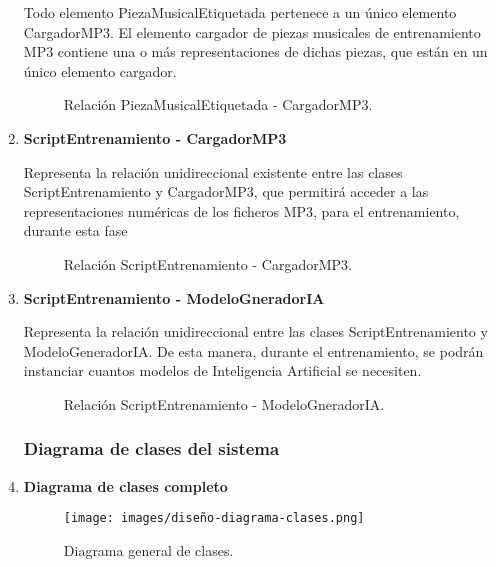 \begin{enumerate}
  Todo elemento PiezaMusicalEtiquetada pertenece a un único elemento CargadorMP3. El elemento cargador de piezas musicales de entrenamiento MP3 contiene una o más representaciones de dichas piezas, que están en un único elemento cargador.

  \begin{figure}[H]
    \centering
    
    \caption{Relación PiezaMusicalEtiquetada - CargadorMP3.}
  \end{figure}

  \item \textbf{ScriptEntrenamiento - CargadorMP3}

  Representa la relación unidireccional existente entre las clases ScriptEntrenamiento y CargadorMP3, que permitirá acceder a las representaciones numéricas de los ficheros MP3, para el entrenamiento, durante esta fase

  \begin{figure}[H]
    \centering
    
    \caption{Relación ScriptEntrenamiento - CargadorMP3.}
  \end{figure}

  \item \textbf{ScriptEntrenamiento - ModeloGneradorIA}

  Representa la relación unidireccional entre las clases ScriptEntrenamiento y ModeloGeneradorIA. De esta manera, durante el entrenamiento, se podrán instanciar cuantos modelos de Inteligencia Artificial se necesiten.

  \begin{figure}[H]
    \centering
    
    \caption{Relación ScriptEntrenamiento - ModeloGneradorIA.}
  \end{figure}

  \subsubsection{Diagrama de clases del sistema}

  \item \textbf{Diagrama de clases completo}

  \begin{figure}[H]
    \centering
    \texttt{[image: images/diseño-diagrama-clases.png]}
    \caption{Diagrama general de clases.}
  \end{figure}

\end{enumerate}